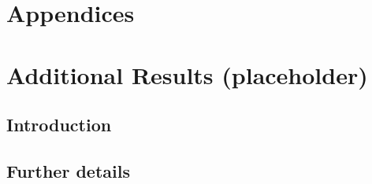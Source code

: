 \documentclass[titlepage, headings=optiontotocandhead]{econark} %
\begin{document}

\pagebreak



\pagebreak


\clearpage
\nocite{Cagetti2005-tk}
\smartbib

\clearpage
\section*{Appendices}

\appendix


\clearpage
\FloatBarrier
{}
\section{Additional Results (placeholder)}
\label{app:additional}
\subsection{Introduction}\label{app:additional-intro}
\subsection{Further details}\label{app:additional-details}
\medskip

\begin{hiddencontent}[OnlineAppendix]
  
\end{hiddencontent}
\end{document}
